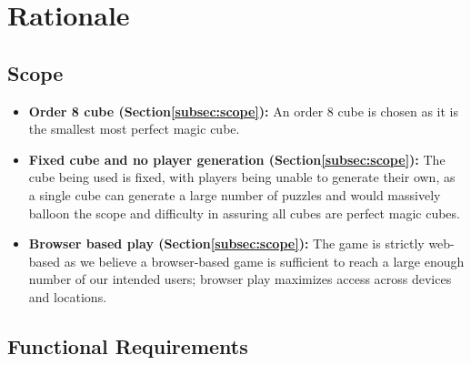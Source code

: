 \documentclass[12pt]{article}
\begin{document}

\section{Rationale}

\subsection{Scope}

\begin{itemize}
\item \textbf{Order 8 cube (Section\ref{subsec:scope}):} An order 8 cube is chosen as it is the smallest most perfect magic cube.
\item \textbf{Fixed cube and no player generation (Section\ref{subsec:scope}):} The cube being used is fixed, with players being unable to generate their own, as a single cube can generate a large number of puzzles and
would massively balloon the scope and difficulty in assuring all cubes are perfect magic cubes.
\item \textbf{Browser based play (Section\ref{subsec:scope}):} The game is strictly web-based as we believe a browser-based game is sufficient to reach a large enough number of our intended users; browser play maximizes access across devices
and locations.
\end{itemize}

\subsection{Functional Requirements}
\end{document}
